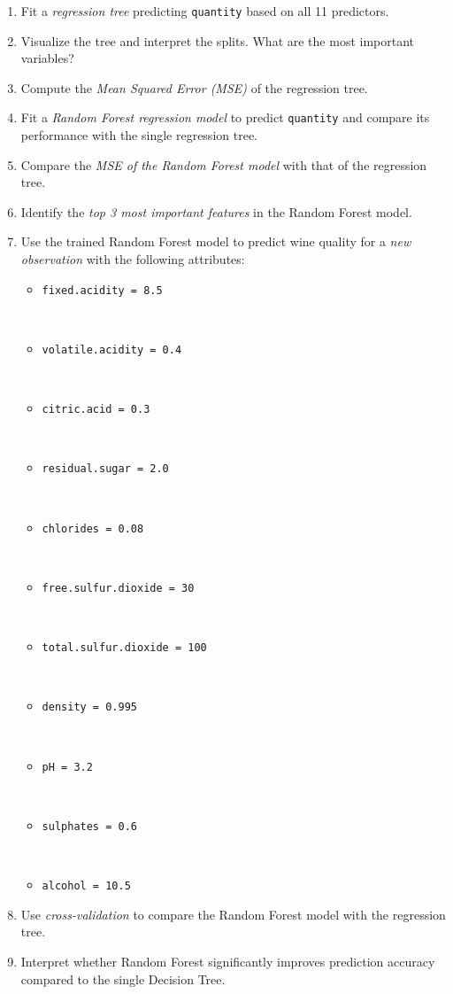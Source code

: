 \documentclass[
  11pt,
]{book}
\providecommand{\tightlist}{%
  \setlength{\itemsep}{0pt}\setlength{\parskip}{0pt}}
\theoremstyle{definition}
\theoremstyle{definition}
\theoremstyle{definition}
\theoremstyle{definition}
\theoremstyle{remark}
\begin{document}
\begin{enumerate}
\def\labelenumi{\arabic{enumi}.}
\setcounter{enumi}{40}
\tightlist
\item
  Fit a \emph{regression tree} predicting \texttt{quantity} based on all 11 predictors.\\
\item
  Visualize the tree and interpret the splits. What are the most important variables?\\
\item
  Compute the \emph{Mean Squared Error (MSE)} of the regression tree.\\
\item
  Fit a \emph{Random Forest regression model} to predict \texttt{quantity} and compare its performance with the single regression tree.\\
\item
  Compare the \emph{MSE of the Random Forest model} with that of the regression tree.\\
\item
  Identify the \emph{top 3 most important features} in the Random Forest model.\\
\item
  Use the trained Random Forest model to predict wine quality for a \emph{new observation} with the following attributes:

  \begin{itemize}
  \tightlist
  \item
    \texttt{fixed.acidity\ =\ 8.5}\strut \\
  \item
    \texttt{volatile.acidity\ =\ 0.4}\strut \\
  \item
    \texttt{citric.acid\ =\ 0.3}\strut \\
  \item
    \texttt{residual.sugar\ =\ 2.0}\strut \\
  \item
    \texttt{chlorides\ =\ 0.08}\strut \\
  \item
    \texttt{free.sulfur.dioxide\ =\ 30}\strut \\
  \item
    \texttt{total.sulfur.dioxide\ =\ 100}\strut \\
  \item
    \texttt{density\ =\ 0.995}\strut \\
  \item
    \texttt{pH\ =\ 3.2}\strut \\
  \item
    \texttt{sulphates\ =\ 0.6}\strut \\
  \item
    \texttt{alcohol\ =\ 10.5}
  \end{itemize}
\item
  Use \emph{cross-validation} to compare the Random Forest model with the regression tree.\\
\item
  Interpret whether Random Forest significantly improves prediction accuracy compared to the single Decision Tree.
\end{enumerate}
\end{document}
